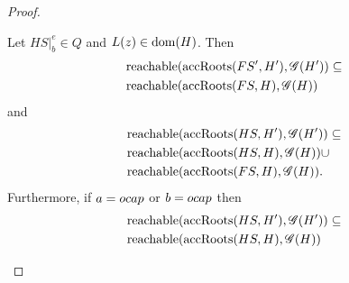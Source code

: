 \begin{proof}
\begin{description}
\begin{description}
\begin{description}
              \begin{lemma} \label{lem:2.15}
                Let $HS|_b^e \in Q$ and $L(z) \in \mbox{$\mathrm{dom}$}(H)$. Then
                \begin{equation} \label{eq:lem2.15a}
                  \begin{aligned}
                    &\mbox{$\mathrm{reachable}$}(\mbox{$\mathrm{accRoots}$}(FS', H'), \mathscr{G}(H')) \subseteq \\
                    &\mbox{$\mathrm{reachable}$}(\mbox{$\mathrm{accRoots}$}(FS, H), \mathscr{G}(H))
                  \end{aligned}
                \end{equation}
                and
                \begin{equation}\label{eq:lem2.15b}
                  \begin{aligned}
                    &\mbox{$\mathrm{reachable}$}(\mbox{$\mathrm{accRoots}$}(HS, H'), \mathscr{G}(H')) \subseteq \\
                    &\mbox{$\mathrm{reachable}$}(\mbox{$\mathrm{accRoots}$}(HS, H), \mathscr{G}(H)) \cup  \\
                    &\mbox{$\mathrm{reachable}$}(\mbox{$\mathrm{accRoots}$}(FS, H), \mathscr{G}(H)).
                  \end{aligned}
                \end{equation}
                Furthermore, if $a = \mbox{$ocap$}$ or $b = \mbox{$ocap$}$ then
                \begin{equation}\label{eq:lem2.15c}
                  \begin{aligned}
                    &\mbox{$\mathrm{reachable}$}(\mbox{$\mathrm{accRoots}$}(HS, H'), \mathscr{G}(H')) \subseteq \\
                    &\mbox{$\mathrm{reachable}$}(\mbox{$\mathrm{accRoots}$}(HS, H), \mathscr{G}(H))
                  \end{aligned}
                \end{equation}
              \end{lemma}


\end{description}
\end{description}
\end{description}
\end{proof}
